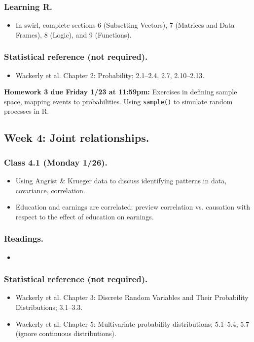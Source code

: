 \documentclass[letterpaper, 12pt, parskip=full,DIV=10]{scrartcl}
\begin{document}
\subsubsection*{Learning R.}
\begin{itemize}
\item In swirl, complete sections 6 (Subsetting Vectors), 7 (Matrices and Data Frames), 8 (Logic), and 9 (Functions).
\end{itemize}

\subsubsection*{Statistical reference (not required).}
\begin{itemize}
\item Wackerly et al. Chapter 2: Probability; 2.1--2.4, 2.7, 2.10--2.13.
\end{itemize}

\textbf{Homework 3 due Friday 1/23 at 11:59pm:}
Exercises in defining sample space, mapping events to probabilities.
Using \texttt{sample()} to simulate random processes in R.

\subsection*{Week 4: Joint relationships.}
\subsubsection*{Class 4.1 (Monday 1/26).}
\begin{itemize}
\item Using Angrist \& Krueger data to discuss identifying patterns in data, covariance, correlation.
\item Education and earnings are correlated; preview correlation vs. causation with respect to the effect of education on earnings.
\end{itemize}

\subsubsection*{Readings.}
\begin{itemize}
\item {}
\end{itemize}

\subsubsection*{Statistical reference (not required).}
\begin{itemize}
\item Wackerly et al. Chapter 3: Discrete Random Variables and Their Probability Distributions; 3.1--3.3.
\item Wackerly et al. Chapter 5: Multivariate probability distributions; 5.1--5.4, 5.7 (ignore continuous distributions).
\end{itemize}
\end{document}
